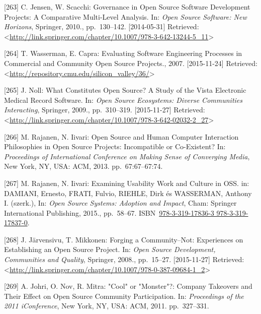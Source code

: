 \documentclass[12pt,magyar,a4paper,oneside]{scrreprt}
\newenvironment{cslreferences}%
  {}%
  {\par}
\begin{document}
\begin{cslreferences}
\leavevmode\hypertarget{ref-jensen_governance_2010}{}%
{[}263{]} C. Jensen, W. Scacchi: Governance in Open Source Software
Development Projects: A Comparative Multi-Level Analysis. In: \emph{Open
Source Software: New Horizons}, Springer, 2010., pp.~130--142.
{[}2014-05-31{]} Retrieved:
\textless{}\url{http://link.springer.com/chapter/10.1007/978-3-642-13244-5_11}\textgreater{}

\leavevmode\hypertarget{ref-wasserman_evaluating_2007}{}%
{[}264{]} T. Wasserman, E. Capra: Evaluating Software Engineering
Processes in Commercial and Community Open Source Projects., 2007.
{[}2015-11-24{]} Retrieved:
\textless{}\url{http://repository.cmu.edu/silicon_valley/36/}\textgreater{}

\leavevmode\hypertarget{ref-noll_what_2009}{}%
{[}265{]} J. Noll: What Constitutes Open Source? A Study of the Vista
Electronic Medical Record Software. In: \emph{Open Source Ecosystems:
Diverse Communities Interacting}, Springer, 2009., pp.~310--319.
{[}2015-11-27{]} Retrieved:
\textless{}\url{http://link.springer.com/chapter/10.1007/978-3-642-02032-2_27}\textgreater{}

\leavevmode\hypertarget{ref-rajanen_open_2013}{}%
{[}266{]} M. Rajanen, N. Iivari: Open Source and Human Computer
Interaction Philosophies in Open Source Projects: Incompatible or
Co-Existent? In: \emph{Proceedings of International Conference on Making
Sense of Converging Media}, New York, NY, USA: ACM, 2013.
pp.~67:67--67:74.

\leavevmode\hypertarget{ref-damiani_examining_2015}{}%
{[}267{]} M. Rajanen, N. Iivari: Examining Usability Work and Culture in
OSS. in: DAMIANI, Ernesto, FRATI, Fulvio, RIEHLE, Dirk és WASSERMAN,
Anthony I. (szerk.), In: \emph{Open Source Systems: Adoption and
Impact}, Cham: Springer International Publishing, 2015., pp.~58--67.
ISBN~\href{https://worldcat.org/isbn/978-3-319-17836-3\%20978-3-319-17837-0}{978-3-319-17836-3 978-3-319-17837-0}.

\leavevmode\hypertarget{ref-jarvensivu_forging_2008}{}%
{[}268{]} J. Järvensivu, T. Mikkonen: Forging a Community--Not:
Experiences on Establishing an Open Source Project. In: \emph{Open
Source Development, Communities and Quality}, Springer, 2008.,
pp.~15--27. {[}2015-11-27{]} Retrieved:
\textless{}\url{http://link.springer.com/chapter/10.1007/978-0-387-09684-1_2}\textgreater{}

\leavevmode\hypertarget{ref-johri_cool_2011}{}%
{[}269{]} A. Johri, O. Nov, R. Mitra: "Cool" or "Monster"?: Company
Takeovers and Their Effect on Open Source Community Participation. In:
\emph{Proceedings of the 2011 iConference}, New York, NY, USA: ACM,
2011. pp.~327--331.


\end{cslreferences}
\end{document}
